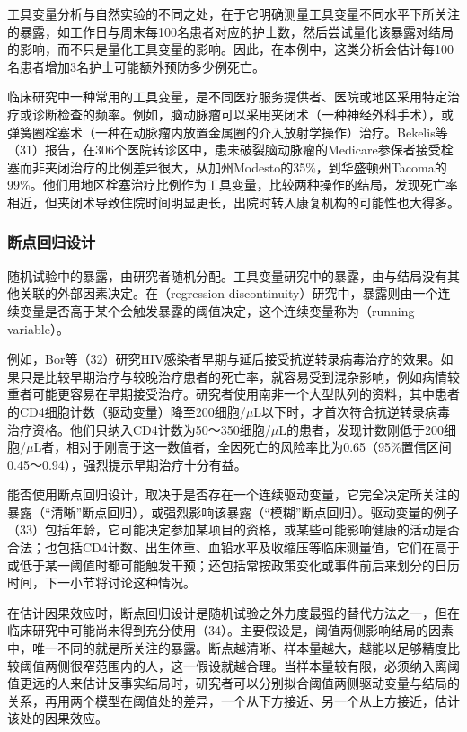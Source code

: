 工具变量分析与自然实验的不同之处，在于它明确测量工具变量不同水平下所关注的暴露，如工作日与周末每100名患者对应的护士数，然后尝试量化该暴露对结局的影响，而不只是量化工具变量的影响。因此，在本例中，这类分析会估计每100名患者增加3名护士可能额外预防多少例死亡。

临床研究中一种常用的工具变量，是不同医疗服务提供者、医院或地区采用特定治疗或诊断检查的频率。例如，脑动脉瘤可以采用夹闭术（一种神经外科手术），或弹簧圈栓塞术（一种在动脉瘤内放置金属圈的介入放射学操作）治疗。Bekelis等（31）报告，在306个医院转诊区中，患未破裂脑动脉瘤的Medicare参保者接受栓塞而非夹闭治疗的比例差异很大，从加州Modesto的35\%，到华盛顿州Tacoma的99\%。他们用地区栓塞治疗比例作为工具变量，比较两种操作的结局，发现死亡率相近，但夹闭术导致住院时间明显更长，出院时转入康复机构的可能性也大得多。

\subsubsection{断点回归设计}
随机试验中的暴露，由研究者随机分配。工具变量研究中的暴露，由与结局没有其他关联的外部因素决定。在（regression discontinuity）研究中，暴露则由一个连续变量是否高于某个会触发暴露的阈值决定，这个连续变量称为（running variable）。

例如，Bor等（32）研究HIV感染者早期与延后接受抗逆转录病毒治疗的效果。如果只是比较早期治疗与较晚治疗患者的死亡率，就容易受到混杂影响，例如病情较重者可能更容易在早期接受治疗。研究者使用南非一个大型队列的资料，其中患者的CD4细胞计数（驱动变量）降至200细胞/$\mu$L以下时，才首次符合抗逆转录病毒治疗资格。他们只纳入CD4计数为50～350细胞/$\mu$L的患者，发现计数刚低于200细胞/$\mu$L者，相对于刚高于这一数值者，全因死亡的风险率比为0.65（95\%置信区间0.45～0.94），强烈提示早期治疗十分有益。

能否使用断点回归设计，取决于是否存在一个连续驱动变量，它完全决定所关注的暴露（“清晰”断点回归），或强烈影响该暴露（“模糊”断点回归）。驱动变量的例子（33）包括年龄，它可能决定参加某项目的资格，或某些可能影响健康的活动是否合法；也包括CD4计数、出生体重、血铅水平及收缩压等临床测量值，它们在高于或低于某一阈值时都可能触发干预；还包括常按政策变化或事件前后来划分的日历时间，下一小节将讨论这种情况。

在估计因果效应时，断点回归设计是随机试验之外力度最强的替代方法之一，但在临床研究中可能尚未得到充分使用（34）。主要假设是，阈值两侧影响结局的因素中，唯一不同的就是所关注的暴露。断点越清晰、样本量越大，越能以足够精度比较阈值两侧很窄范围内的人，这一假设就越合理。当样本量较有限，必须纳入离阈值更远的人来估计反事实结局时，研究者可以分别拟合阈值两侧驱动变量与结局的关系，再用两个模型在阈值处的差异，一个从下方接近、另一个从上方接近，估计该处的因果效应。

